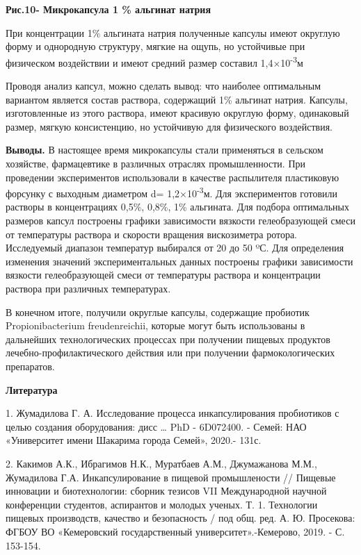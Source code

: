 {\bfseries Рис.10- Микрокапсула 1 \% альгинат натрия}

При концентрации 1\% альгината натрия полученные капсулы имеют округлую
форму и однородную структуру, мягкие на ощупь, но устойчивые при
физическом воздействии и имеют средний размер составил
1,4×10\textsuperscript{-3}м

Проводя анализ капсул, можно сделать вывод: что наиболее оптимальным
вариантом является состав раствора, содержащий 1\% альгинат натрия.
Капсулы, изготовленные из этого раствора, имеют красивую округлую форму,
одинаковый размер, мягкую консистенцию, но устойчивую для физического
воздействия.

{\bfseries Выводы.} В настоящее время микрокапсулы стали применяться в
сельском хозяйстве, фармацевтике в различных отраслях промышленности.
При проведении экспериментов использовали в качестве распылителя
пластиковую форсунку с выходным диаметром d=
1,2×10\textsuperscript{-3}м. Для экспериментов готовили растворы в
концентрациях 0,5\%, 0,8\%, 1\% альгината. Для подбора оптимальных
размеров капсул построены графики зависимости вязкости гелеобразующей
смеси от температуры раствора и скорости вращения вискозиметра ротора.
Исследуемый диапазон температур выбирался от 20 до 50 ºС. Для
определения изменения значений экспериментальных данных построены
графики зависимости вязкости гелеобразующей смеси от температуры
раствора и концентрации раствора при различных температурах.

В конечном итоге, получили округлые капсулы, содержащие пробиотик
Propionibacterium freudenreichii, которые могут быть использованы в
дальнейших технологических процессах при получении пищевых продуктов
лечебно-профилактического действия или при получении фармокологических
препаратов.

{\bfseries Литература}

1. Жумадилова Г. А. Исследование процесса инкапсулирования пробиотиков с
целью создания оборудования: дисс \ldots{} PhD - 6D072400. - Семей: НАО
«Университет имени Шакарима города Семей», 2020.- 131с.

2. Какимов А.К., Ибрагимов Н.К., Муратбаев А.М., Джумажанова М.М.,
Жумадилова Г.А. Инкапсулирование в пищевой промышлености // Пищевые
инновации и биотехнологии: сборник тезисов VII Международной научной
конференции студентов, аспирантов и молодых ученых. Т. 1. Технологии
пищевых производств, качество и безопасность / под общ. ред. А. Ю.
Просекова: ФГБОУ ВО «Кемеровский государственный университет».-Кемерово,
2019. - С. 153-154.

